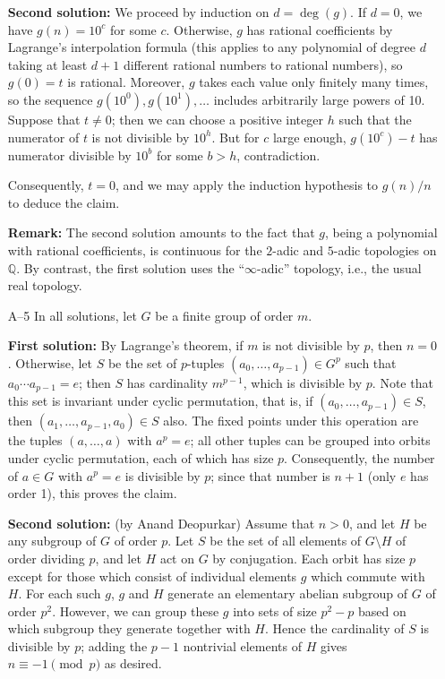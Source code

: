 \documentclass[amssymb,twocolumn,pra,10pt,aps]{revtex4-1}
\begin{document}
\begin{itemize}
\textbf{Second solution:}
We proceed by induction on $d = \deg(g)$.
If $d=0$, we have $g(n) = 10^c$ for some $c$. Otherwise,
$g$ has rational coefficients by Lagrange's interpolation formula (this
applies to any polynomial of degree $d$ taking at least $d+1$
different rational numbers to rational numbers), so $g(0) = t$ is rational.
Moreover, $g$ takes each value only finitely many times, so the sequence
$g(10^0), g(10^1), \dots$ includes arbitrarily large powers of 10.
Suppose that $t \neq 0$; then we can choose a positive integer $h$ such that
the numerator of $t$ is not divisible by $10^h$.
But for $c$ large enough, $g(10^c) - t$ has numerator divisible by
$10^b$ for some $b>h$, contradiction.

Consequently, $t=0$, and we may apply the induction hypothesis to $g(n)/n$
to deduce the claim.

\textbf{Remark:} The second solution amounts to the fact that $g$, being
a polynomial with rational coefficients, is continuous for the $2$-adic
and $5$-adic topologies on $\mathbb{Q}$. By contrast, the first solution
uses the ``$\infty$-adic'' topology, i.e., the usual real topology.

\item[A--5]
In all solutions, let $G$ be a finite group of order $m$.

\textbf{First solution:}
By Lagrange's theorem, if $m$ is
not divisible by $p$, then $n = 0$. Otherwise, let $S$ be the set of
$p$-tuples $(a_0,\dots,a_{p-1}) \in G^p$ such that $a_0 \cdots a_{p-1} = e$;
then $S$ has cardinality $m^{p-1}$, which is divisible by $p$.
Note that this set is invariant under cyclic permutation, that is,
if $(a_0,\dots,a_{p-1}) \in S$, then $(a_1,\dots,a_{p-1},a_0) \in S$ also.
The fixed points under this operation are the tuples
$(a,\dots,a)$ with $a^p = e$; all other tuples can be grouped into orbits
under cyclic permutation, each of which has size $p$. Consequently,
the number of $a \in G$ with $a^p = e$ is divisible by $p$; since that number
is $n+1$ (only $e$ has order 1), this proves the claim.

\textbf{Second solution:}
(by Anand Deopurkar)
Assume that $n > 0$, and let $H$ be any subgroup of $G$ of order $p$.
Let $S$ be the set of all elements of $G \setminus H$
of order dividing $p$, and let
$H$ act on $G$ by conjugation. Each orbit has size $p$ except for those
which consist of individual elements $g$ which commute with $H$.
For each such $g$, $g$ and $H$ generate an elementary abelian subgroup of
$G$ of order $p^2$. However, we can group these $g$ into sets of size
$p^2-p$ based on which subgroup they generate together with $H$.
Hence the cardinality of $S$ is divisible by $p$; adding the $p-1$
nontrivial elements of $H$ gives $n \equiv -1 \pmod{p}$ as desired.


\end{itemize}
\end{document}

